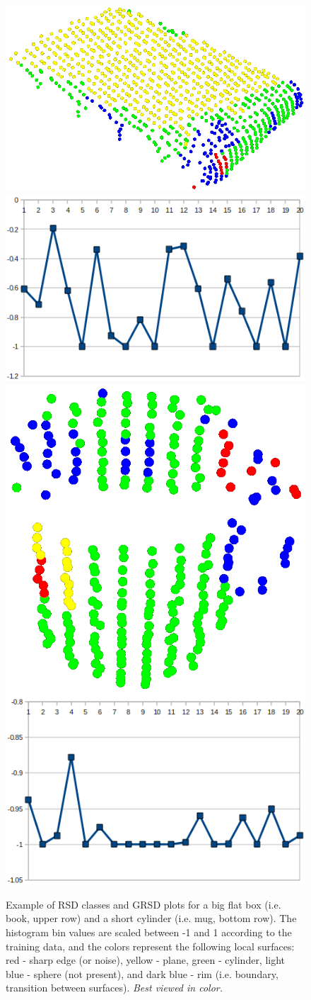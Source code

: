\documentclass[conference]{sty/IEEEtran}
\begin{document}
\begin{figure}[htb!]
  \begin{center}
    \includegraphics[width=.4\columnwidth]{figures/grsd/book.png}
\hfill
    \includegraphics[width=.48\columnwidth]{figures/grsd/book_global.png} \\
\hfill
    \includegraphics[width=.3\columnwidth]{figures/grsd/mug.png}
\hfill
    \includegraphics[width=.48\columnwidth]{figures/grsd/mug_global.png}
\caption{Example of RSD classes and GRSD plots for a big flat box (i.e. book, upper row) and a short cylinder (i.e. mug, bottom row).
The histogram bin values are scaled between -1 and 1 according to the
training data, and the colors represent the following local surfaces:
red - sharp edge (or noise), yellow - plane, green - cylinder, light blue -
sphere (not present), and dark blue - rim (i.e. boundary, transition between surfaces).
\emph{Best viewed in color.}
}
    \label{fig:gfpfh}
  \end{center}
\vspace{-2ex}
\end{figure}
\end{document}
